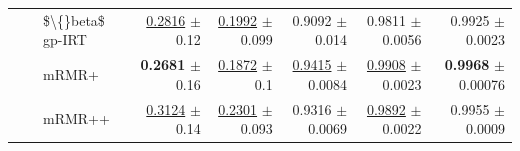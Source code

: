 \begin{longtable}{llp{}rrrrr}
 &  & \$\textbackslash\{\}beta\$ gp-IRT & \underline{0.2816} {\scriptsize $\pm$ 0.12} & \underline{0.1992} {\scriptsize $\pm$ 0.099} & 0.9092 {\scriptsize $\pm$ 0.014} & 0.9811 {\scriptsize $\pm$ 0.0056} & 0.9925 {\scriptsize $\pm$ 0.0023} \\
 &  & mRMR+ & \textbf{0.2681} {\scriptsize $\pm$ 0.16} & \underline{0.1872} {\scriptsize $\pm$ 0.1} & \underline{0.9415} {\scriptsize $\pm$ 0.0084} & \underline{0.9908} {\scriptsize $\pm$ 0.0023} & \textbf{0.9968} {\scriptsize $\pm$ 0.00076} \\
 &  & mRMR++ & \underline{0.3124} {\scriptsize $\pm$ 0.14} & \underline{0.2301} {\scriptsize $\pm$ 0.093} & 0.9316 {\scriptsize $\pm$ 0.0069} & \underline{0.9892} {\scriptsize $\pm$ 0.0022} & 0.9955 {\scriptsize $\pm$ 0.0009} \\
\end{longtable}